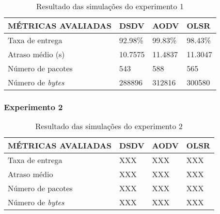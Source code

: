 \begin{table}[H]
	\centering
	\caption{Resultado das simula\c{c}\~oes do experimento 1}
	\begin{tabular}{ | l | l | l | l | }
		\hline
		M\'ETRICAS AVALIADAS & DSDV & AODV & OLSR \\ \hline
		Taxa de entrega & 92.98\% & 99.83\% & 98.43\% \\ \hline
		Atraso m\'edio (s) & 10.7575 & 11.4837 & 11.3047 \\ \hline
		N\'umero de pacotes & 543 & 588 & 565 \\ \hline
		N\'umero de \textit{bytes} & 288896 & 312816 & 300580 \\ \hline
	\end{tabular}
	\label{tabExp1Result}
\end{table}

\subsubsection{Experimento 2}

\begin{table}[H]
	\centering
	\caption{Resultado das simula\c{c}\~oes do experimento 2}
	\begin{tabular}{ | l | l | l | l | }
		\hline
		M\'ETRICAS AVALIADAS & DSDV & AODV & OLSR \\ \hline
		Taxa de entrega & XXX & XXX & XXX  \\ \hline
		Atraso m\'edio & XXX & XXX & XXX  \\ \hline
		N\'umero de pacotes & XXX & XXX & XXX  \\ \hline
		N\'umero de \textit{bytes} & XXX & XXX & XXX  \\ \hline
	\end{tabular}
	\label{tabExp2Result}
\end{table}
